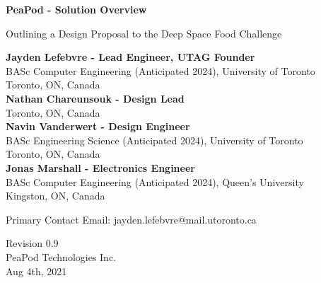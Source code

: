 \documentclass{report}
\begin{document}
\begin{titlepage}
    \begin{center}
        \vspace*{1.2cm}

        \textbf{\large{PeaPod - Solution Overview}}

        \vspace{0.5cm}

        Outlining a Design Proposal to the Deep Space Food Challenge

        \vfill \small{

            \textbf{Jayden Lefebvre - Lead Engineer, UTAG Founder}\\
            BASc Computer Engineering (Anticipated 2024), University of Toronto\\
            Toronto, ON, Canada\\
            \vspace{.5cm}
            \textbf{Nathan Chareunsouk - Design Lead}\\Toronto, ON, Canada\\
            \vspace{.5cm}
            \textbf{Navin Vanderwert - Design Engineer}\\
            BASc Engineering Science (Anticipated 2024), University of Toronto\\
            Toronto, ON, Canada\\
            \vspace{.5cm}
            \textbf{Jonas Marshall - Electronics Engineer}\\
            BASc Computer Engineering (Anticipated 2024), Queen's University\\
            Kingston, ON, Canada

        }

        \vspace{1cm}

        Primary Contact Email: jayden.lefebvre@mail.utoronto.ca

        \vspace{.75cm}

        Revision 0.9\\
        PeaPod Technologies Inc.\\
        Aug 4th, 2021

    \end{center}
\end{titlepage}

\thispagestyle{plain}
\end{document}
